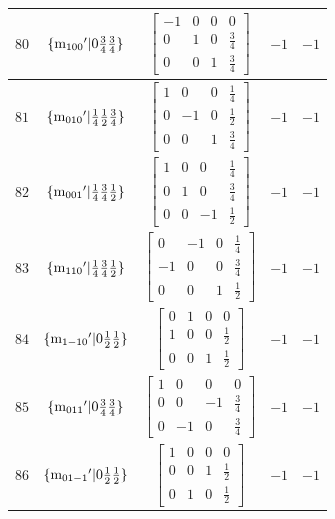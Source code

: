 \documentclass[fleqn,8pt]{jsarticle}
\begin{document}
\begin{longtable}{ccccc}
$ 80 $ & $ \{{\rm m}_{100}{}'|0 \frac{3}{4} \frac{3}{4}\} $ & $ \begin{bmatrix} -1 & 0 & 0 & 0 \\ 0 & 1 & 0 & \frac{3}{4} \\ 0 & 0 & 1 & \frac{3}{4} \end{bmatrix} $ & $ -1 $ & $ -1 $ \\ \hline
$ 81 $ & $ \{{\rm m}_{010}{}'|\frac{1}{4} \frac{1}{2} \frac{3}{4}\} $ & $ \begin{bmatrix} 1 & 0 & 0 & \frac{1}{4} \\ 0 & -1 & 0 & \frac{1}{2} \\ 0 & 0 & 1 & \frac{3}{4} \end{bmatrix} $ & $ -1 $ & $ -1 $ \\ \hline
$ 82 $ & $ \{{\rm m}_{001}{}'|\frac{1}{4} \frac{3}{4} \frac{1}{2}\} $ & $ \begin{bmatrix} 1 & 0 & 0 & \frac{1}{4} \\ 0 & 1 & 0 & \frac{3}{4} \\ 0 & 0 & -1 & \frac{1}{2} \end{bmatrix} $ & $ -1 $ & $ -1 $ \\ \hline
$ 83 $ & $ \{{\rm m}_{110}{}'|\frac{1}{4} \frac{3}{4} \frac{1}{2}\} $ & $ \begin{bmatrix} 0 & -1 & 0 & \frac{1}{4} \\ -1 & 0 & 0 & \frac{3}{4} \\ 0 & 0 & 1 & \frac{1}{2} \end{bmatrix} $ & $ -1 $ & $ -1 $ \\ \hline
$ 84 $ & $ \{{\rm m}_{1-10}{}'|0 \frac{1}{2} \frac{1}{2}\} $ & $ \begin{bmatrix} 0 & 1 & 0 & 0 \\ 1 & 0 & 0 & \frac{1}{2} \\ 0 & 0 & 1 & \frac{1}{2} \end{bmatrix} $ & $ -1 $ & $ -1 $ \\ \hline
$ 85 $ & $ \{{\rm m}_{011}{}'|0 \frac{3}{4} \frac{3}{4}\} $ & $ \begin{bmatrix} 1 & 0 & 0 & 0 \\ 0 & 0 & -1 & \frac{3}{4} \\ 0 & -1 & 0 & \frac{3}{4} \end{bmatrix} $ & $ -1 $ & $ -1 $ \\ \hline
$ 86 $ & $ \{{\rm m}_{01-1}{}'|0 \frac{1}{2} \frac{1}{2}\} $ & $ \begin{bmatrix} 1 & 0 & 0 & 0 \\ 0 & 0 & 1 & \frac{1}{2} \\ 0 & 1 & 0 & \frac{1}{2} \end{bmatrix} $ & $ -1 $ & $ -1 $ \\ \hline

\end{longtable}
\end{document}
